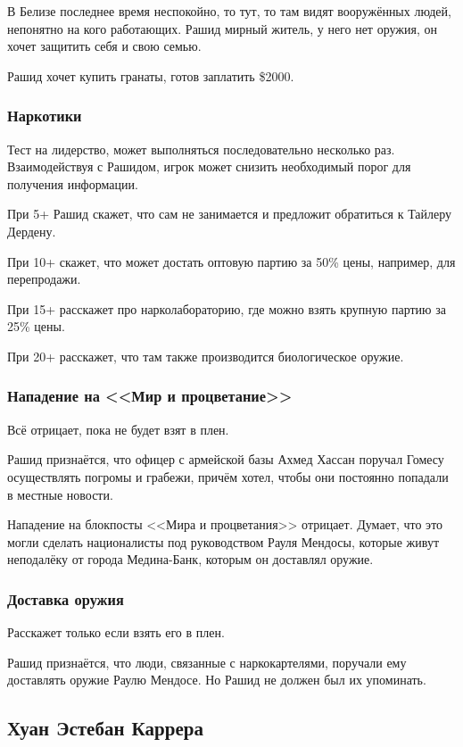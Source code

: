 \documentclass{article}
\begin{document}
В Белизе последнее время неспокойно, то тут, то там видят вооружённых
людей, непонятно на кого работающих. Рашид мирный житель, у него нет
оружия, он хочет защитить себя и свою семью.

Рашид хочет купить гранаты, готов заплатить \$2000.

\subsubsection{Наркотики}\label{narcotics}

Тест на лидерство, может выполняться последовательно несколько раз.
Взаимодействуя с Рашидом, игрок может снизить необходимый порог для
получения информации.

При 5+ Рашид скажет, что сам не занимается и предложит обратиться к
Тайлеру Дердену.

При 10+ скажет, что может достать оптовую партию за 50\% цены, например,
для перепродажи.

При 15+ расскажет про нарколабораторию, где можно взять крупную партию
за 25\% цены.

При 20+ расскажет, что там также производится биологическое оружие.

\subsubsection{Нападение на <<Мир и
процветание>>}\label{pap-attack-gomez}

Всё отрицает, пока не будет взят в плен.

Рашид признаётся, что офицер с армейской базы Ахмед Хассан поручал
Гомесу осуществлять погромы и грабежи, причём хотел, чтобы они постоянно
попадали в местные новости.

Нападение на блокпосты <<Мира и процветания>> отрицает. Думает, что это
могли сделать националисты под руководством Рауля Мендосы, которые живут
неподалёку от города Медина-Банк, которым он доставлял оружие.

\subsubsection{Доставка
оружия}\label{weapons-delivery}

Расскажет только если взять его в плен.

Рашид признаётся, что люди, связанные с наркокартелями, поручали ему
доставлять оружие Раулю Мендосе. Но Рашид не должен был их упоминать.

\subsection{Хуан Эстебан
Каррера}\label{juan-carrera}
\end{document}
